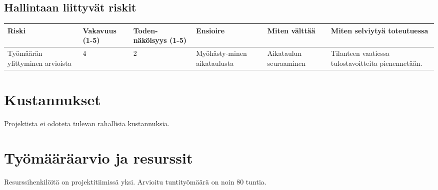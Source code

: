 \documentclass[a4paper, 12pt, finnish]{article}
\begin{document}
\subsection{Hallintaan liittyvät riskit}
\begin{table}[!htpb]
\begin{tabularx}{1.1\textwidth}{|X|X|X|X|X|X|}
\hline
\rowcolor[HTML]{EFEFEF} 
\textbf{Riski} & \textbf{Vakavuus (1-5)} & \textbf{Toden-näköisyys (1-5)} & \textbf{Ensioire} & \textbf{Miten välttää} & \textbf{Miten selviytyä toteutuessa} \\ \hline
Työmäärän ylittyminen arvioista & 4 & 2 & Myöhästy-minen aikataulusta & Aikataulun seuraaminen & Tilanteen vaatiessa tulostavoitteita pienennetään. \\ \hline
\end{tabularx}
\end{table}

\section{Kustannukset}
Projektista ei odoteta tulevan rahallisia kustannuksia.

\section{Työmääräarvio ja resurssit}
Resurssihenkilöitä on projektitiimissä yksi. Arvioitu tuntityömäärä on noin 80 tuntia.
\end{document}
